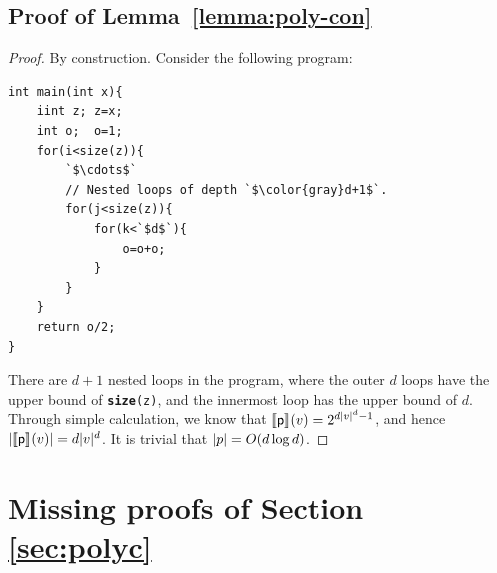 \documentclass[runningheads]{llncs}
\begin{document}
\subsection{Proof of Lemma~\ref{lemma:poly-con}}\label{App_proof_of_lemma:poly-con}

\begin{proof}
By construction.
Consider the following program:
\begin{lstlisting}[xleftmargin=3em,xrightmargin=3em]
int main(int x){
    iint z; z=x;
    int o;  o=1;
    for(i<size(z)){
        `$\cdots$`
        // Nested loops of depth `$\color{gray}d+1$`.
        for(j<size(z)){
            for(k<`$d$`){
                o=o+o;
            }
        }
    }
    return o/2;
}
\end{lstlisting}
There are $d+1$ nested loops in the program, where the outer $d$ loops have the upper bound of \texttt{\textbf{size}(z)}, and the innermost loop has the upper bound of $d$.
Through simple calculation, we know that $\llbracket\mathsf{p}\rrbracket_{}(v)=2^{d\vert v\vert^d-1}$, and hence $\vert\llbracket\mathsf{p}\rrbracket_{}(v)\vert=d\vert v\vert^d$.
It is trivial that $\vert p\vert=O(d\log d)$.
\end{proof}%

\section{Missing proofs of Section \ref{sec:polyc}}\label{app-polyc}
\end{document}
